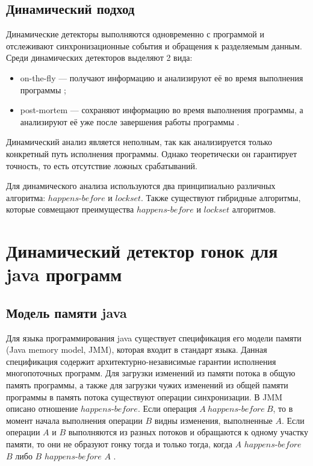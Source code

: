 \subsection{Динамический подход}
Динамические детекторы выполняются одновременно с программой и отслеживают синхронизационные события и обращения к разделяемым данным. Среди динамических детекторов выделяют 2 вида: 
\begin{itemize}
\item on-the-fly --- получают информацию и анализируют её во время выполнения программы \cite{Choi:2002:EPD:543552.512560};
\item post-mortem --- сохраняют информацию во время выполнения программы, а анализируют её уже
после завершения работы программы \cite{PostMortem}.
\end{itemize}
Динамический анализ является неполным, так как анализируется только конкретный путь исполнения программы. Однако теоретически он гарантирует точность, то есть отсутствие ложных срабатываний. 

Для динамического анализа используются два принципиально различных алгоритма: $happens$-$before$\cite{DRD, Happens-Before} и $lockset$\cite{DRD, LockSet, GoldiLocks}. Также существуют гибридные алгоритмы\cite{DRD, Choi:2002:EPD:543552.512560}, которые совмещают преимущества $happens$-$before$ и $lockset$ алгоритмов. 


\FloatBarrier
\section{Динамический детектор гонок для java программ}

\FloatBarrier
\subsection{Модель памяти java}
Для языка программирования java существует спецификация его модели памяти (Java memory model, JMM), которая входит в стандарт языка. Данная спецификация содержит архитектурно-независимые гарантии исполнения многопоточных программ.
Для загрузки изменений из памяти потока в общую память программы, а также для загрузки чужих изменений из общей памяти программы в память потока существуют операции синхронизации. В JMM описано отношение $happens$-$before$. Если операция $A\ happens$-$before\ B$, то в момент начала выполнения операции $B$ видны изменения, выполненные $A$. Если операции $A$ и $B$ выполняются из разных потоков и обращаются к одному участку памяти, то они не образуют гонку тогда и только тогда, когда $A$ $happens$-$before$ $B$ либо $B$ $happens$-$before$ $A$ \cite{JMM}.



